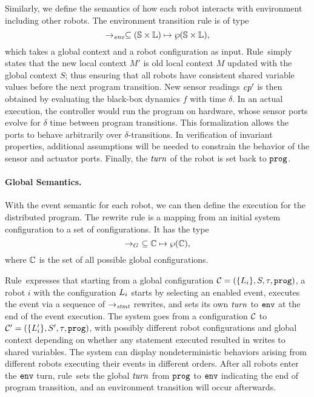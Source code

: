 Similarly, we define the semantics of how each robot interacts with environment including other robots.
The environment transition rule is of type
\[
\rightarrow_\mathit{env} \subseteq (\mathbb{S} \times \mathbb{L}) \mapsto \wp(\mathbb{S}\times \mathbb{L}),
\]
which takes a global context and a robot configuration as input.
Rule~\RobotEnvRule simply states that the new local context $M'$ is
old local context $M$ updated with the global context $S$;
thus ensuring that all robots have consistent shared variable values before the next program transition.
New sensor readings $\mathit{cp}'$ is then obtained by evaluating the black-box dynamics $f$ with time $\delta$.
In an actual execution, the controller would run the program on hardware,
whose sensor ports evolve for $\delta$ time between program transitions.
This formalization allows the ports to behave arbitrarily over $\delta$-transitions.
In verification of invariant properties,
additional assumptions will be needed to constrain the behavior of the sensor and actuator ports.
Finally, the $\mathit{turn}$ of the robot is set back to $\mathtt{prog}$.


\paragraph{Global Semantics.}

With the event semantic for each robot, we can then define the execution for the distributed \lgname program.
The rewrite rule is a mapping from an initial system configuration to a set of configurations.
It has the type
\[
\rightarrow_G\ \subseteq \mathbb{C} \mapsto \wp(\mathbb{C}),
\]
where $\mathbb{C}$ is the set of all possible global configurations.

Rule~\EventTransRule expresses that starting from a global configuration $\mathcal{C} = (\{L_{i}\}, S, \tau, \mathtt{prog})$,
a robot $i$ with the configuration $L_{i}$ starts by selecting an enabled event,
executes the event via a sequence of $\rightarrow_\mathit{stmt}$ rewrites,
and sets its own $\mathit{turn}$ to $\mathtt{env}$ at the end of the event execution.
The system goes from a configuration $\mathcal{C}$ to $\mathcal{C}^{\prime}= (\{L_{i}^\prime\}, S^{\prime}, \tau, \mathtt{prog})$,
with possibly different robot configurations and global context depending on
whether any statement executed resulted in writes to shared variables.
The system can display nondeterministic behaviors arising from different robots executing their events in different orders.
After all robots enter the $\mathtt{env}$ turn, rule~\EndProgTransRule sets the global $\mathit{turn}$ from $\mathtt{prog}$ to $\mathtt{env}$
indicating the end of program transition, and an environment transition will occur afterwards.

